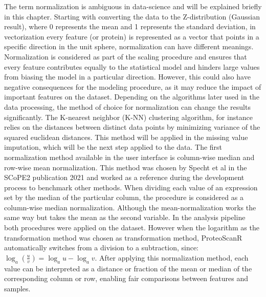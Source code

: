 \documentclass[
  11pt,
]{article}
\begin{document}
The term normalization is ambiguous in data-science and will be explained briefly in this chapter. Starting with converting the data to the Z-distribution (Gaussian result), where 0 represents the mean and 1 represents the standard deviation, in vectorization every feature (or protein) is represented as a vector that points in a specific direction in the unit sphere, normalization can have different meanings. Normalization is considered as part of the scaling procedure and ensures that every feature contributes equally to the statistical model and hinders large values from biasing the model in a particular direction. However, this could also have negative consequences for the modeling procedure, as it may reduce the impact of important features on the dataset.
Depending on the algorithms later used in the data processing, the method of choice for normalization can change the results significantly. The K-nearest neighbor (K-NN) clustering algorithm, for instance relies on the distances between distinct data points by minimizing variance of the squared euclidean distances. This method will be applied in the missing value imputation, which will be the next step applied to the data.
The first normalization method available in the user interface is column-wise median and row-wise mean normalization. This method was chosen by Specht et al in the SCoPE2 publication 2021 \citep{Specht2021} and worked as a reference during the development process to benchmark other methods. When dividing each value of an expression set by the median of the particular column, the procedure is considered as a column-wise median normalization. Although the mean-normalization works the same way but takes the mean as the second variable. In the analysis pipeline both procedures were applied on the dataset. However when the logarithm as the transformation method was chosen as transformation method, ProteoScanR automatically switches from a division to a subtraction, since:
\(\log_a \left(\frac{u}{v}\right)=\log_a u-\log_a v\). After applying this normalization method, each value can be interpreted as a distance or fraction of the mean or median of the corresponding column or row, enabling fair comparisons between features and samples.
\end{document}
